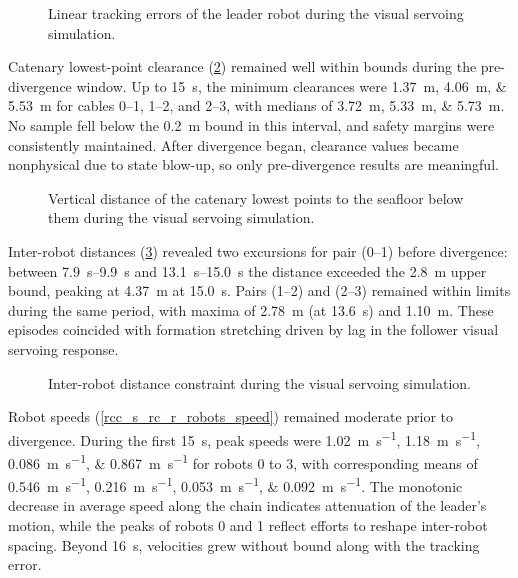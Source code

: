 \begin{figure}
	\centering
	\caption{Linear tracking errors of the leader robot during the visual servoing simulation.}
	\label{rcc_s_rc_r_error}
\end{figure}

Catenary lowest-point clearance (\cref{rcc_s_rc_r_lowest_point}) remained well within bounds during
the pre-divergence window. Up to \qty{15}{\s}, the minimum clearances were
\qtylist{1.37;4.06;5.53}{\m} for cables 0--1, 1--2, and 2--3, with medians of
\qtylist{3.72;5.33;5.73}{\m}. No sample fell below the \qty{0.2}{\m} bound in this interval, and
safety margins were consistently maintained. After divergence began, clearance values became
nonphysical due to state blow-up, so only pre-divergence results are meaningful.

\begin{figure}
	\centering
	\caption{Vertical distance of the catenary lowest points to the seafloor below them during the visual servoing simulation.}
	\label{rcc_s_rc_r_lowest_point}
\end{figure}

Inter-robot distances (\cref{rcc_s_rc_r_inter_robot_distance}) revealed two excursions for pair
(0--1) before divergence: between \qtyrange{7.9}{9.9}{\s} and \qtyrange{13.1}{15.0}{\s} the
distance exceeded the \qty{2.8}{\m} upper bound, peaking at \qty{4.37}{\m} at \qty{15.0}{\s}. Pairs
(1--2) and (2--3) remained within limits during the same period, with maxima of \qty{2.78}{\m} (at
\qty{13.6}{\s}) and \qty{1.10}{\m}. These episodes coincided with formation stretching driven by
lag in the follower visual servoing response.

\begin{figure}
	\centering
	\caption{Inter-robot distance constraint during the visual servoing simulation.}
	\label{rcc_s_rc_r_inter_robot_distance}
\end{figure}

Robot speeds (\cref{rcc_s_rc_r_robots_speed}) remained moderate prior to divergence. During the
first \qty{15}{\s}, peak speeds were \qtylist{1.02;1.18;0.086;0.867}{\m\per\s} for robots 0 to 3,
with corresponding means of \qtylist{0.546;0.216;0.053;0.092}{\m\per\s}. The monotonic decrease in
average speed along the chain indicates attenuation of the leader's motion, while the peaks of
robots 0 and 1 reflect efforts to reshape inter-robot spacing. Beyond \qty{16}{\s}, velocities grew
without bound along with the tracking error.

